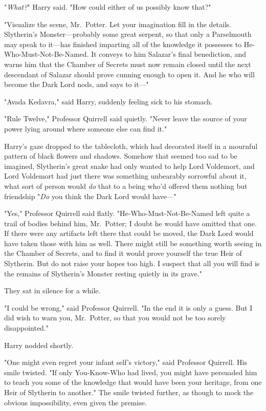"\emph{What?}" Harry said. "How could either of us possibly know that?"

"Visualize the scene, Mr.~Potter. Let your imagination fill in the details.
Slytherin's Monster—probably some great serpent, so that only a Parselmouth
may speak to it—has finished imparting all of the knowledge it possesses to
He-Who-Must-Not-Be-Named. It conveys to him Salazar's final benediction, and
warns him that the Chamber of Secrets must now remain closed until the next
descendant of Salazar should prove cunning enough to open it. And he who will
become the Dark Lord nods, and says to it—"

"Avada Kedavra," said Harry, suddenly feeling sick to his stomach.

"Rule Twelve," Professor Quirrell said quietly. "Never leave the source of your
power lying around where someone else can find it."

Harry's gaze dropped to the tablecloth, which had decorated itself in a
mournful pattern of black flowers and shadows. Somehow that seemed{\el} too
sad to be imagined, Slytherin's great snake had only wanted to help Lord
Voldemort, and Lord Voldemort had just{\el} there was something unbearably
sorrowful about it, what sort of person would \emph{do} that to a being who'd
offered them nothing but friendship{\el} "\emph{Do} you think the Dark Lord
would have—"

"Yes," Professor Quirrell said flatly. "He-Who-Must-Not-Be-Named left quite a
trail of bodies behind him, Mr.~Potter; I doubt he would have omitted that one.
If there were any artifacts left there that could be moved, the Dark Lord would
have taken those with him as well. There might still be something worth seeing
in the Chamber of Secrets, and to find it would prove yourself the true Heir of
Slytherin. But do not raise your hopes too high. I suspect that all you will
find is the remains of Slytherin's Monster resting quietly in its grave."

They sat in silence for a while.

"I could be wrong," said Professor Quirrell. "In the end it is only a guess.
But I did wish to warn you, Mr.~Potter, so that you would not be too sorely
disappointed."

Harry nodded shortly.

"One might even regret your infant self's victory," said Professor Quirrell.
His smile twisted. "If only You-Know-Who had lived, you might have persuaded
him to teach you some of the knowledge that would have been your heritage, from
one Heir of Slytherin to another." The smile twisted further, as though to mock
the obvious impossibility, even given the premise.


